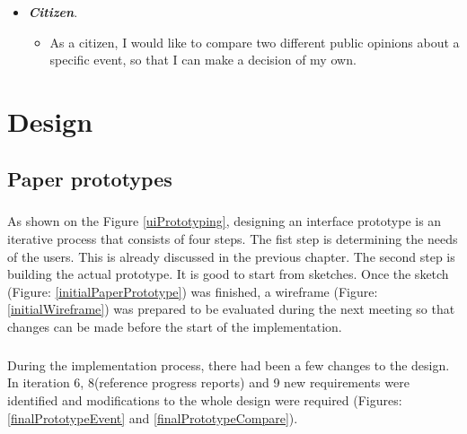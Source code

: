 \documentclass{l4proj}
\begin{document}
\begin{itemize}
	\item \textbf{\textit{Citizen}}.
	\begin{itemize}
		\item As a citizen, I would like to compare two different public opinions about a specific event, so that I can make a decision of my own. 
	\end{itemize}
\end{itemize}

\chapter{Design}

\section{Paper prototypes}
\label{sec:paper-prototypes}
\paragraph{}
As shown on the Figure \ref{uiPrototyping}, designing an interface prototype is an iterative process that consists of four steps. The fist step is determining the needs of the users. This is already discussed in the previous chapter. The second step is building the actual prototype. It is good to start from sketches. Once the sketch (Figure: \ref{initialPaperPrototype}) was finished, a wireframe (Figure: \ref{initialWireframe}) was prepared to be evaluated during the next meeting so that changes can be made before the start of the implementation. 

\paragraph{}
During the implementation process, there had been a few changes to the design. In iteration 6, 8(reference progress reports) and 9 new requirements were identified and modifications to the whole design were required (Figures: \ref{finalPrototypeEvent} and \ref{finalPrototypeCompare}). 
\end{document}
